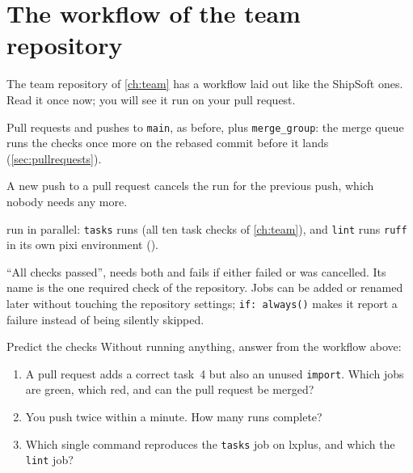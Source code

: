 \section{The workflow of the team repository}
\label{sec:teamci}

The team repository of \cref{ch:team} has a workflow laid out like the
ShipSoft ones. Read it once now; you will see it run on your pull request.


\begin{description}[style=nextline]
  \item[Events.] Pull requests and pushes to \texttt{main}, as before, plus
    \texttt{merge\_group}: the merge queue runs the checks once more on the
    rebased commit before it lands (\cref{sec:pullrequests}).
  \item[Concurrency.] A new push to a pull request cancels the run for the
    previous push, which nobody needs any more.
  \item[Two jobs] run in parallel: \texttt{tasks} runs
     (all ten task checks of \cref{ch:team}), and
    \texttt{lint} runs \texttt{ruff} in its own pixi environment
    ().
  \item[One summary job,] ``All checks passed'', needs both and fails if
    either failed or was cancelled. Its name is the one required check of the
    repository. Jobs can be added or renamed later without touching the
    repository settings; \texttt{if: always()} makes it report a failure
    instead of being silently skipped.
\end{description}

\begin{exercise}{Predict the checks}
Without running anything, answer from the workflow above:
\begin{enumerate}
  \item A pull request adds a correct task~4 but also an unused
        \texttt{import}. Which jobs are green, which red, and can the pull
        request be merged?
  \item You push twice within a minute. How many runs complete?
  \item Which single command reproduces the \texttt{tasks} job on lxplus,
        and which the \texttt{lint} job?
\end{enumerate}
\end{exercise}

